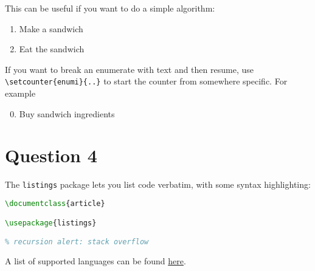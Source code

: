 \documentclass{article} %
\begin{document}
This can be useful if you want to do a simple algorithm:
\begin{enumerate}[Step 1. ]
\item Make a sandwich
\item Eat the sandwich
\end{enumerate}

If you want to break an enumerate with text and then resume, use \verb|\setcounter{enumi}{..}| to start the counter from somewhere specific.  For example
\begin{enumerate}[Step 1. ]
\setcounter{enumi}{-1}
\item Buy sandwich ingredients
\end{enumerate} 

\section*{Question 4}
The \texttt{listings} package lets you list code verbatim, with some syntax highlighting:
\begin{lstlisting}[language=tex]
\documentclass{article}

\usepackage{listings}

% recursion alert: stack overflow
\end{lstlisting}
A list of supported languages can be found \href{https://en.wikibooks.org/wiki/LaTeX/Source_Code_Listings}{here}.
\end{document}
